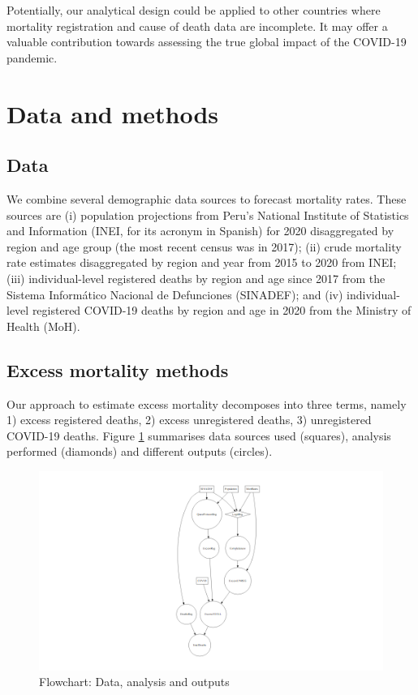 \documentclass[
]{article}
\begin{document}
Potentially, our analytical design could be applied to other countries where mortality registration and cause of death data are incomplete. It may offer a valuable contribution towards assessing the true global impact of the COVID-19 pandemic.

\hypertarget{data-and-methods}{%
\section{Data and methods}\label{data-and-methods}}

\hypertarget{data}{%
\subsection{Data}\label{data}}

We combine several demographic data sources to forecast mortality rates. These sources are (i) population projections from Peru's National Institute of Statistics and Information (INEI, for its acronym in Spanish) for 2020 disaggregated by region and age group (the most recent census was in 2017); (ii) crude mortality rate estimates disaggregated by region and year from 2015 to 2020 from INEI; (iii) individual-level registered deaths by region and age since 2017 from the Sistema Informático Nacional de Defunciones (SINADEF); and (iv) individual-level registered COVID-19 deaths by region and age in 2020 from the Ministry of Health (MoH).

\hypertarget{excess-mortality-methods}{%
\subsection{Excess mortality methods}\label{excess-mortality-methods}}

Our approach to estimate excess mortality decomposes into three terms, namely 1) excess registered deaths, 2) excess unregistered deaths, 3) unregistered COVID-19 deaths. Figure \ref{fig:model} summarises data sources used (squares), analysis performed (diamonds) and different outputs (circles).

\begin{figure}
\centering
\includegraphics{article_files/figure-latex/model-1.png}
\caption{\label{fig:model}Flowchart: Data, analysis and outputs}
\end{figure}
\end{document}
